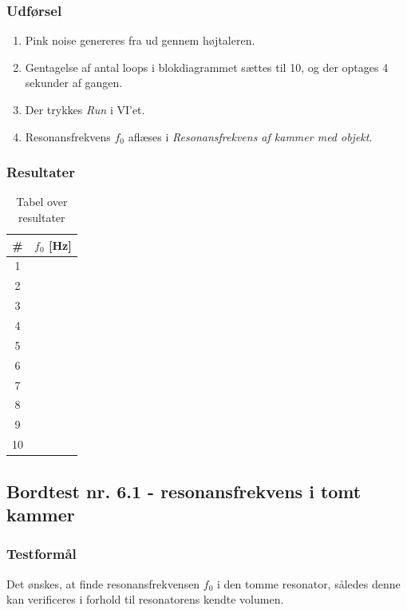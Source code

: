 	\subsubsection{Udførsel}
			
			\begin{enumerate}
			\item Pink noise genereres fra \onlineg  ud gennem højtaleren. 
			\item Gentagelse af antal loops i blokdiagrammet sættes til 10, og der optages 4 sekunder af gangen. 
			\item Der trykkes \textit{Run} i VI'et. 
			\item Resonansfrekvens $f_{0}$ aflæses i \textit{Resonansfrekvens af kammer med objekt}.
			\end{enumerate}
			
	\subsubsection{Resultater}
	
	
			
		\begin{table}[]
\centering
\caption{Tabel over resultater}
\label{bordtest6resultater}
\begin{tabular}{c|l}
\textbf{\#}& \textbf{$f_{0}$ {[Hz]}} \\
\hline
1  &                  \\
2  &                  \\
3  &                  \\
4  &                  \\
5  &                  \\
6  &                  \\
7  &                  \\
8  &                  \\
9  &                  \\
10 &                 
\end{tabular}
\end{table}
			
	
	\subsection{Bordtest nr. 6.1 - resonansfrekvens i tomt kammer}
	
		\subsubsection{Testformål}
	Det ønskes, at finde resonansfrekvensen $f_{0}$ i den tomme resonator, således denne kan verificeres i forhold til resonatorens kendte volumen.  	
	
